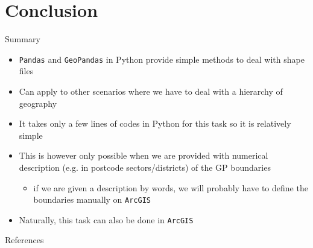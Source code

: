 \documentclass[hyperref={breaklinks,colorlinks,
   urlcolor=blue,citecolor=blue,linkcolor=red}]{beamer}
\newcommand{\Python}{{\sc Python}\xspace}
\begin{document}

\section{Conclusion}
\begin{frame}{Summary}
\begin{itemize}
\item{\texttt{Pandas} and \texttt{GeoPandas} in \Python
provide simple methods to deal with shape files}
\item{Can apply to other scenarios where we have to deal with a hierarchy of geography}
\item{It takes only a few lines of codes in \Python
for this task so it is relatively simple}
\item{This is however only possible when we are provided with
numerical description (e.g. in postcode sectors/districts) of the GP boundaries}
\begin{itemize}
\item{if we are given a description by words, we will probably have to define the boundaries manually on \texttt{ArcGIS}}
\end{itemize}
\item{Naturally, this task can also be done in \texttt{ArcGIS}}
\end{itemize}

\end{frame}





\begin{frame}[allowframebreaks]{References} 

%
%

%




\end{frame}
\end{document}
